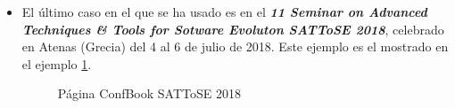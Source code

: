 \documentclass[a4paper, 12pt]{book}
\begin{document}
\begin{itemize}
\item El último caso en el que se ha usado es en el \textbf{\textit{11 Seminar on Advanced Techniques \& Tools for Sotware Evoluton SATToSE 2018}}, celebrado en Atenas (Grecia) del 4 al 6 de julio de 2018. Este ejemplo es el mostrado en el ejemplo \ref{fig:imgSATToSE}.
\begin{figure}[h!]
	\centering
	\caption{Página ConfBook SATToSE 2018}
	\label{fig:imgSATToSE}
\end{figure}
\end{itemize}


\end{document}
